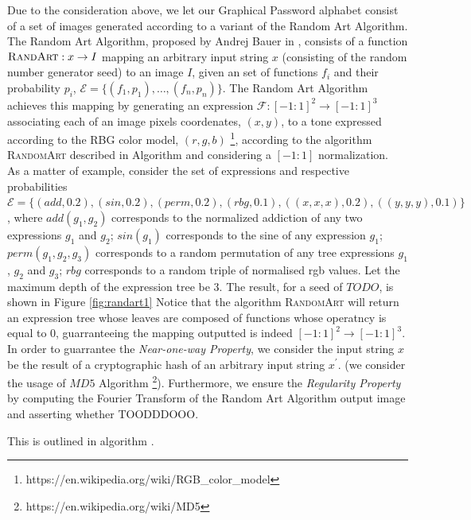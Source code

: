 \documentclass[11pt,a4paper]{article}
\theoremstyle{defn, nobreak=true}
\begin{document}
Due to the consideration above, we let our Graphical Password alphabet consist of a set of images generated according to a variant of the Random Art Algorithm. The Random Art Algorithm, proposed by Andrej Bauer in \cite{randart}, consists of a function $\textsc{RandArt}:x \rightarrow I$ mapping an arbitrary input string $x$ (consisting of the random number generator seed) to an image $I$, given an set of functions $f_i$ and their probability $p_i$, $\mathcal{E}=\{(f_1,p_1), \dots, (f_n,p_n)\}$. The Random Art Algorithm achieves this mapping by generating an expression $\mathcal{F}:\left[-1:1\right]^2 \rightarrow \left[-1:1\right]^3$ associating each of an image pixels coordenates, $(x,y)$, to a tone expressed according to the RBG color model, $(r,g,b)$ \footnote{https://en.wikipedia.org/wiki/RGB\_color\_model}, according to the algorithm \textsc{RandomArt} described in Algorithm \cite{alg:randart} and considering a $\left[-1:1\right]$ normalization. \\

As a matter of example, consider the set of expressions and respective probabilities $\mathcal{E}=\{(\mathit{add},0.2),(\mathit{sin},0.2),(\mathit{perm},0.2),(\mathit{rbg},0.1),((x,x,x),0.2),((y,y,y),0.1)\}$, where $\mathit{add}(g_1,g_2)$ corresponds to the normalized addiction of any two expressions $g_1$ and $g_2$; $\mathit{sin}(g_1)$ corresponds to the sine of any expression $g_1$; $\mathit{perm}(g_1,g_2,g_3)$ corresponds to a random permutation of any tree expressions $g_1$, $g_2$ and $g_3$; $\mathit{rbg}$ corresponds to a random triple of normalised rgb values. Let the maximum depth of the expression tree be $3$. The result, for a seed of $TODO$, is shown in Figure \ref{fig:randart1} Notice that the algorithm \textsc{RandomArt} will return an expression tree whose leaves are composed of functions whose operatncy is equal to $0$, guarranteeing the mapping outputted is indeed $\left[-1:1\right]^2 \rightarrow \left[-1:1\right]^3$. \\

In order to guarrantee the \textit{Near-one-way Property}, we consider the input string $x$ be the result of a cryptographic hash of an arbitrary input string $x^{\prime}$. (we consider the usage of $MD5$ Algorithm \footnote{https://en.wikipedia.org/wiki/MD5}). Furthermore, we ensure the \textit{Regularity Property} by computing the Fourier Transform of the Random Art Algorithm output image and asserting whether {\color{red} TOODDDOOO}. 

This is outlined in algorithm \cite{alg:randart}.
\end{document}
